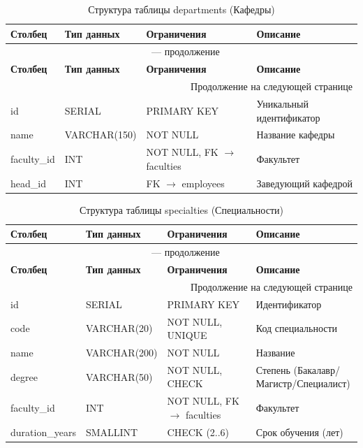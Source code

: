 \documentclass[14pt, a4paper]{extreport}
\begin{document}
\begin{longtable}{p{3cm} p{3cm} p{4cm} p{4.5cm}}
\caption{Структура таблицы departments (Кафедры)} \\
\toprule
\textbf{Столбец} & \textbf{Тип данных} & \textbf{Ограничения} & \textbf{Описание} \\
\midrule
\endfirsthead
\multicolumn{4}{c}{{\tablename\ \thetable{} --- продолжение}} \\
\toprule
\textbf{Столбец} & \textbf{Тип данных} & \textbf{Ограничения} & \textbf{Описание} \\
\midrule
\endhead
\midrule
\multicolumn{4}{r}{{Продолжение на следующей странице}} \\
\endfoot
\bottomrule
\endlastfoot
id & SERIAL & PRIMARY KEY & Уникальный идентификатор \\
name & VARCHAR(150) & NOT NULL & Название кафедры \\
faculty\_id & INT & NOT NULL, FK $\rightarrow$ faculties & Факультет \\
head\_id & INT & FK $\rightarrow$ employees & Заведующий кафедрой \\
\end{longtable}

\begin{longtable}{p{3cm} p{3cm} p{4cm} p{4.5cm}}
\caption{Структура таблицы specialties (Специальности)} \\
\toprule
\textbf{Столбец} & \textbf{Тип данных} & \textbf{Ограничения} & \textbf{Описание} \\
\midrule
\endfirsthead
\multicolumn{4}{c}{{\tablename\ \thetable{} --- продолжение}} \\
\toprule
\textbf{Столбец} & \textbf{Тип данных} & \textbf{Ограничения} & \textbf{Описание} \\
\midrule
\endhead
\midrule
\multicolumn{4}{r}{{Продолжение на следующей странице}} \\
\endfoot
\bottomrule
\endlastfoot
id & SERIAL & PRIMARY KEY & Идентификатор \\
code & VARCHAR(20) & NOT NULL, UNIQUE & Код специальности \\
name & VARCHAR(200) & NOT NULL & Название \\
degree & VARCHAR(50) & NOT NULL, CHECK & Степень (Бакалавр/Магистр/Специалист) \\
faculty\_id & INT & NOT NULL, FK $\rightarrow$ faculties & Факультет \\
duration\_years & SMALLINT & CHECK (2..6) & Срок обучения (лет) \\
\end{longtable}
\end{document}
